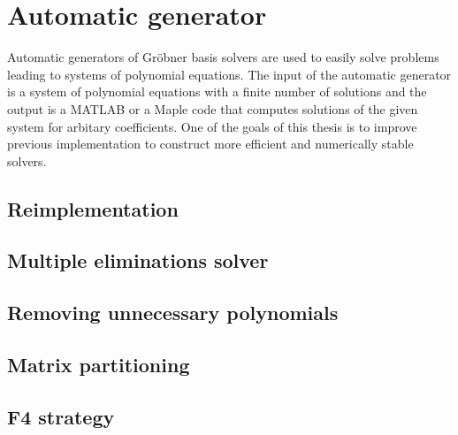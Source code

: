 \chapter{Automatic generator}
Automatic generators of Gr\"obner basis solvers are used to easily solve problems leading to systems of polynomial equations. The input of the automatic generator is a system of polynomial equations with a finite number of solutions and the output is a MATLAB or a Maple code that computes solutions of the given system for arbitary coefficients. One of the goals of this thesis is to improve previous implementation \cite{AutoGen} to construct more efficient and numerically stable solvers.

\section{Reimplementation}

\section{Multiple eliminations solver}

\section{Removing unnecessary polynomials}

\section{Matrix partitioning}

\section{F4 strategy}

